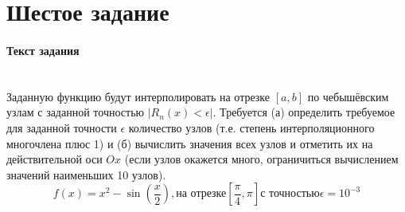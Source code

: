 \section{Шестое задание}

\paragraph{Текст задания} ~\\
Заданную функцию будут интерполировать на отрезке $\left[a, b\right]$ по чебышёвским узлам с заданной точностью $|R_{n}(x) < \epsilon|$. Требуется (а) определить требуемое для заданной точности $\epsilon$ количество узлов (т.е. степень интерполяционного многочлена плюс 1) и (б) вычислить значения всех узлов и отметить их на действительной оси $Ox$ (если узлов окажется много, ограничиться вычислением значений наименьших 10 узлов).\\[3mm]
\[
  f(x) = x^{2} - \sin\left(\frac{x}{2}\right), \text{на отрезке} \left[\frac{\pi}{4}, \pi\right] \text{с точностью} \epsilon = 10^{-3}
\]

